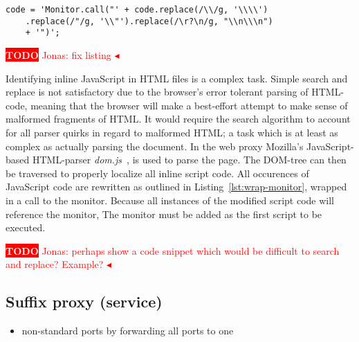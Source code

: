 \documentclass{llncs}
\newcommand{\todo}[1]{\colorbox{red}{\textcolor{white}{\sffamily\bfseries\scriptsize TODO}} \textcolor{red}{#1} \textcolor{red}{$\blacktriangleleft$}}
\begin{document}
\begin{lstlisting}[label=lst:wrap-monitor, caption=Example of monitor wrapping]
code = 'Monitor.call("' + code.replace(/\\/g, '\\\\')
	.replace(/"/g, '\\"').replace(/\r?\n/g, "\\n\\\n")
	+ '")';
\end{lstlisting}
\todo{Jonas: fix listing}


Identifying inline JavaScript in HTML files is a complex task. 
Simple search and replace is not satisfactory due to the browser's error tolerant parsing of HTML-code, meaning that the 
browser will make a best-effort attempt to make sense of malformed fragments of 
HTML. It would require the search 
algorithm to account for all parser quirks in regard to malformed HTML;
a task which is at least as complex as actually parsing the document.
In the web proxy Mozilla's JavaScript-based HTML-parser \emph{dom.js}~\cite{Mozilla:dom.js}, is used 
to parse the page. The DOM-tree can then be traversed to properly localize 
all inline script code. All occurences of JavaScript code are rewritten as 
outlined in Listing~\ref{lst:wrap-monitor}, wrapped in a call to the monitor.
Because all instances of the modified script code will reference the monitor, 
The monitor must be added as the first script to be executed.

\todo{Jonas: perhaps show a code snippet which would be difficult to search and replace? Example?}

\subsection{Suffix proxy (service)}

\begin{itemize}
\item non-standard ports by forwarding all ports to one
\end{itemize}
\end{document}
